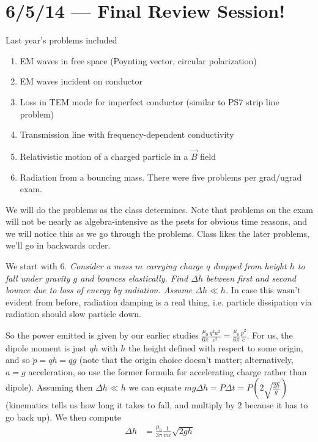 \documentclass[10pt]{report}
\begin{document}
\chapter{6/5/14 --- Final Review Session!}

Last year's problems included 
\begin{enumerate}
    \item EM waves in free space (Poynting vector, circular polarization)
    \item EM waves incident on conductor
    \item Loss in TEM mode for imperfect conductor (similar to PS7 strip line problem)
    \item Transmission line with frequency-dependent conductivity
    \item Relativistic motion of a charged particle in a $\vec{B}$ field
    \item Radiation from a bouncing mass. There were five problems per grad/ugrad exam. 
\end{enumerate}
We will do the problems as the class determines. Note that problems on the exam will not be nearly as algebra-intensive as the psets for obvious time reasons, and we will notice this as we go through the problems. Class likes the later problems, we'll go in backwards order.

We start with 6. \emph{Consider a mass $m$ carrying charge $q$ dropped from height $h$ to fall under gravity $g$ and bounces elastically. Find $\Delta h$ between first and second bounce due to loss of energy by radiation. Assume $\Delta h \ll h$.} In case this wasn't evident from before, radiation damping is a real thing, i.e. particle dissipation via radiation should slow particle down.

So the power emitted is given by our earlier studies $\frac{\mu_0}{6\pi}\frac{q^2a^2}{c^2} = \frac{\mu_0}{6\pi}\frac{\ddot{p}^2}{c}$. For us, the dipole moment is just $qh$ with $h$ the height defined with respect to some origin, and so $\ddot{p} = q\ddot{h} = qg$ (note that the origin choice doesn't matter; alternatively, $a=g$ acceleration, so use the former formula for accelerating charge rather than dipole). Assuming then $\Delta h \ll h$ we can equate $mg\Delta h = P\Delta t = P\left(2\sqrt{\frac{2h}{g}}\right)$ (kinematics tells us how long it takes to fall, and multiply by $2$ because it has to go back up). We then compute
\begin{align}
    \Delta h &= \frac{\mu_0}{3\pi}\frac{1}{mc}\sqrt{2gh}
\end{align}
\end{document}
